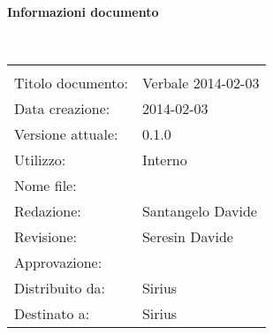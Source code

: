 \noindent\begin{Large}\textbf{Informazioni documento}\end{Large}\\
\begin{center}
\begin{tabular}{ll}
\hline\\
Titolo documento: & Verbale 2014-02-03\\
Data creazione: & 2014-02-03\\
Versione attuale: & 0.1.0\\
Utilizzo: & Interno\\
Nome file:& \VerbaleB{}\\
Redazione: & Santangelo Davide\\
Revisione: & Seresin Davide\\
Approvazione: & \\
Distribuito da:& Sirius\\
Destinato a: & Sirius\\
\end{tabular}
\end{center}

